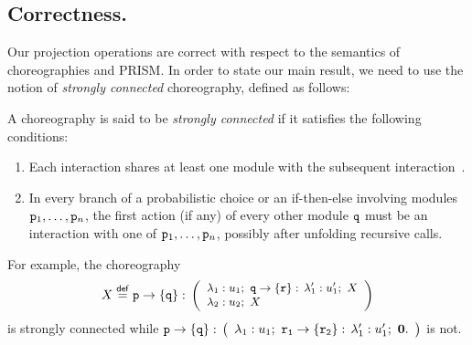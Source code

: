 \smallskip

\subsection{Correctness.} Our projection operations are correct with
respect to the semantics of choreographies and PRISM.
%
In order to state our main result, we need to use the notion of {\em
  strongly connected} choreography, defined as follows:
%
\begin{definition}
  A choreography is said to be \emph{strongly connected} if it satisfies the following conditions:
  \begin{enumerate}
  \item Each interaction shares at least one module with the
    subsequent interaction~\cite{CHY12}.
      \item In every branch of a probabilistic choice or an if-then-else involving modules $\mathtt{p}_1, \ldots, \mathtt{p}_n$, the first action (if any) of every other module $\mathtt{q}$ must be an interaction with one of $\mathtt{p}_1, \ldots, \mathtt{p}_n$, possibly after unfolding recursive calls.
  \end{enumerate}
\end{definition}

%
%
%

For example, the choreography
\begin{displaymath}\small
  X\stackrel{\mathsf{def}}{=} 
  \mathtt{p}\rightarrow \{\mathtt{q}\}:\,
  \left(
    \begin{array}{l}
      \lambda_1: u_1;\ \mathtt{q}\rightarrow \{\mathtt{r}\}:\, \lambda_1':u_1';\ X    \\
      \lambda_2: u_2;\ X
    \end{array}
  \right)
\end{displaymath}
%
is strongly connected while 
% 
$%
\interactBase{p}{q}:\,
\left(
  \begin{array}{l}
    \lambda_1: u_1;\ \interactBase{r_1}{r_2}:\, \lambda_1':u_1';\ \CEnd.
  \end{array}
\right) $ is not.
% 

